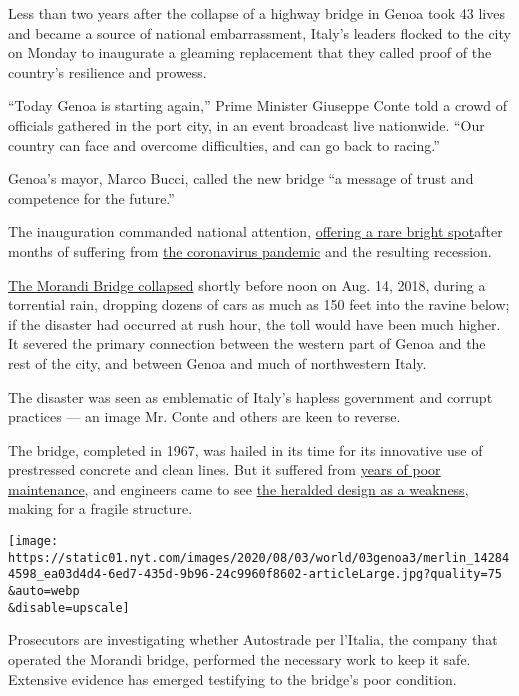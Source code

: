 Less than two years after the collapse of a highway bridge in Genoa took
43 lives and became a source of national embarrassment, Italy's leaders
flocked to the city on Monday to inaugurate a gleaming replacement that
they called proof of the country's resilience and prowess.

``Today Genoa is starting again,'' Prime Minister Giuseppe Conte told a
crowd of officials gathered in the port city, in an event broadcast live
nationwide. ``Our country can face and overcome difficulties, and can go
back to racing.''

Genoa's mayor, Marco Bucci, called the new bridge ``a message of trust
and competence for the future.''

The inauguration commanded national attention,
\href{https://www.nytimes.com/2020/08/02/world/europe/genoa-Morandi-bridge-replacement.html}{offering
a rare bright spot}after months of suffering from
\href{https://www.nytimes.com/2020/07/31/world/europe/italy-coronavirus-reopening.html}{the
coronavirus pandemic} and the resulting recession.

\href{https://www.nytimes.com/interactive/2018/09/06/world/europe/genoa-italy-bridge.html}{The
Morandi Bridge collapsed} shortly before noon on Aug. 14, 2018, during a
torrential rain, dropping dozens of cars as much as 150 feet into the
ravine below; if the disaster had occurred at rush hour, the toll would
have been much higher. It severed the primary connection between the
western part of Genoa and the rest of the city, and between Genoa and
much of northwestern Italy.

The disaster was seen as emblematic of Italy's hapless government and
corrupt practices --- an image Mr. Conte and others are keen to reverse.

The bridge, completed in 1967, was hailed in its time for its innovative
use of prestressed concrete and clean lines. But it suffered from
\href{https://www.nytimes.com/2018/08/15/world/europe/italy-genoa-bridge-collapse.html}{years
of poor maintenance}, and engineers came to see
\href{https://www.nytimes.com/2018/08/16/world/europe/italy-bridge-collapse-design.html}{the
heralded design as a weakness}, making for a fragile structure.

\texttt{[image: https://static01.nyt.com/images/2020/08/03/world/03genoa3/merlin\_142844598\_ea03d4d4-6ed7-435d-9b96-24c9960f8602-articleLarge.jpg?quality=75\\\&auto=webp\\\&disable=upscale]}

Prosecutors are investigating whether Autostrade per l'Italia, the
company that operated the Morandi bridge, performed the necessary work
to keep it safe. Extensive evidence has emerged testifying to the
bridge's poor condition.

